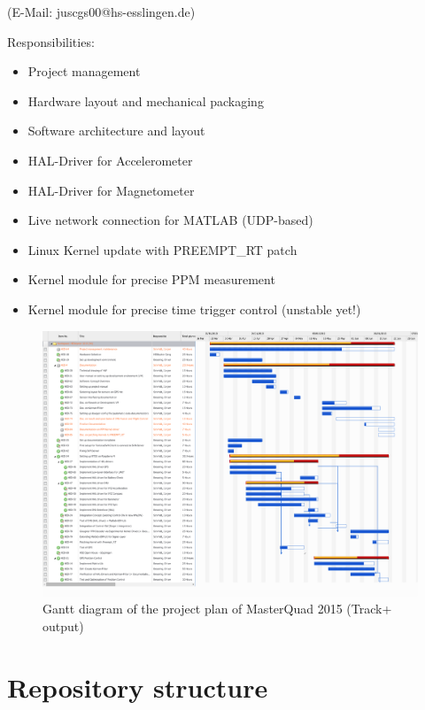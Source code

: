 \vspace{0.5cm}

 (E-Mail: juscgs00@hs-esslingen.de)

Responsibilities:
\begin{itemize}
	\item Project management
	\item Hardware layout and mechanical packaging
	\item Software architecture and layout
	\item HAL-Driver for Accelerometer
	\item HAL-Driver for Magnetometer
	\item Live network connection for MATLAB (UDP-based)
	\item Linux Kernel update with PREEMPT\_RT patch
	\item Kernel module for precise PPM measurement
	\item Kernel module for precise time trigger control (unstable yet!)
\end{itemize}


\begin{figure}[H]
    \centering
    \includegraphics[angle=90,width=\textwidth]{fig/ch-project-goals/project_plan}
    \caption[Gantt diagram of project MasterQuad 2015 (Track+)]{Gantt diagram of the project plan of MasterQuad 2015 (Track+ output)}
    \label{fig:projGoals:ganttDiagram}
\end{figure}

\section{Repository structure}
\label{sec:projGoals:repos}


